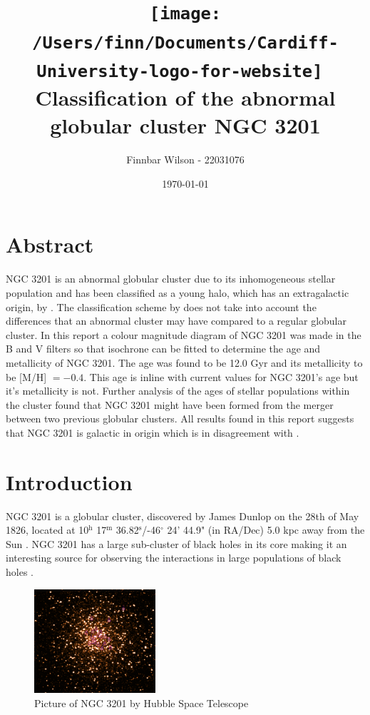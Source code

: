 \documentclass[11pt]{article}
\title{\vspace{-2cm}
\texttt{[image: /Users/finn/Documents/Cardiff-University-logo-for-website]}~\\[1cm]
Classification of the abnormal globular cluster NGC 3201 
}
\author{Finnbar Wilson - 22031076}
\date{\today}
\begin{document}
\maketitle

\section*{Abstract}

NGC 3201 is an abnormal globular cluster due to its inhomogeneous stellar population and has been classified as a young halo, which has an extragalactic origin, by \citet{Mackey}. The classification scheme by \citet{Mackey} does not take into account the differences that an abnormal cluster may have compared to a regular globular cluster. In this report a colour magnitude diagram of NGC 3201 was made in the B and V filters so that isochrone can be fitted to determine the age and metallicity of NGC 3201. The age was found to be 12.0 Gyr and its metallicity to be [M/H] $=-0.4$. This age is inline with current values for NGC 3201's age but it's metallicity is not. Further analysis of the ages of stellar populations within the cluster found that NGC 3201 might have been formed from the merger between two previous globular clusters. All results found in this report suggests that NGC 3201 is galactic in origin which is in disagreement with \citet{Mackey}.

\pagebreak
\section{Introduction}

NGC 3201 is a globular cluster, discovered by James Dunlop on the 28th of May 1826, located at 10$^{\text{h}}$ 17$^{\text{m}}$ 36.82$^{\text{s}}$/-46$^{\circ}$ 24' 44.9" (in RA/Dec) 5.0 kpc away from the Sun \citep{3201fact}. NGC 3201 has a large sub-cluster of black holes in its core making it an interesting source for observing the interactions in large populations of black holes \citep{blackholes}.

\begin{figure}[h]
	\centering
	\includegraphics[width=0.4\textwidth]{../Figures/NGC3201}
	\caption{Picture of NGC 3201 by Hubble Space Telescope \citep{image}}
\end{figure}
\end{document}
